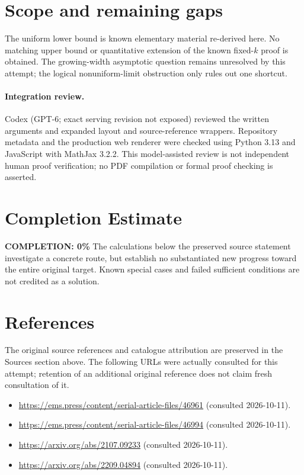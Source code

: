 \documentclass[11pt]{article}
\begin{document}
\section{Scope and remaining gaps}

The uniform lower bound is known elementary material re-derived here. No
matching upper bound or quantitative extension of the known fixed-$k$ proof is
obtained. The growing-width asymptotic question remains unresolved by this
attempt; the logical nonuniform-limit obstruction only rules out one shortcut.

\paragraph{Integration review.} Codex (GPT-6; exact serving revision not exposed) reviewed the written arguments and expanded layout and source-reference wrappers. Repository metadata and the production web renderer were checked using Python 3.13 and JavaScript with MathJax 3.2.2. This model-assisted review is not independent human proof verification; no PDF compilation or formal proof checking is asserted.

\section{Completion Estimate}
\noindent\textbf{COMPLETION: 0\%}
The calculations below the preserved source statement investigate a concrete route,
but establish no substantiated new progress toward the entire original target.
Known special cases and failed sufficient conditions are not credited as a solution.
\section{References}
The original source references and catalogue attribution are preserved in the
Sources section above. The following URLs were actually consulted for this attempt;
retention of an additional original reference does not claim fresh consultation of it.
\begin{itemize}
\item \url{https://ems.press/content/serial-article-files/46961} (consulted 2026-10-11). 
\item \url{https://ems.press/content/serial-article-files/46994} (consulted 2026-10-11). 
\item \url{https://arxiv.org/abs/2107.09233} (consulted 2026-10-11). 
\item \url{https://arxiv.org/abs/2209.04894} (consulted 2026-10-11). 
\end{itemize}
\end{document}
